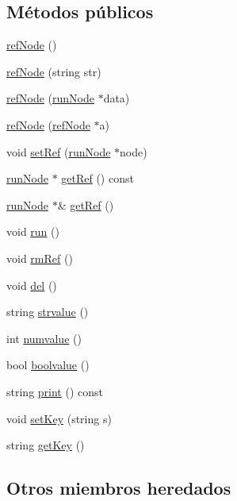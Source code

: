 \subsection*{Métodos públicos}
\begin{DoxyCompactItemize}
\item 
\hyperlink{classrefNode_a4dadca3053650b8f5ba67802460e3b94}{ref\-Node} ()
\item 
\hyperlink{classrefNode_a880ba91153659c5d38f5af5cebd27d87}{ref\-Node} (string str)
\item 
\hyperlink{classrefNode_aa2afe3e64503c9f44406b67cd40215cd}{ref\-Node} (\hyperlink{classrunNode}{run\-Node} $\ast$data)
\item 
\hyperlink{classrefNode_adea8c8e42d1a17012ee62ddeb22b5500}{ref\-Node} (\hyperlink{classrefNode}{ref\-Node} $\ast$a)
\item 
void \hyperlink{classrefNode_a6e05edbe71779a62106d8b511ae3373f}{set\-Ref} (\hyperlink{classrunNode}{run\-Node} $\ast$node)
\item 
\hyperlink{classrunNode}{run\-Node} $\ast$ \hyperlink{classrefNode_af3287bf7b98a88d97bf7076cbae2e50b}{get\-Ref} () const 
\item 
\hyperlink{classrunNode}{run\-Node} $\ast$\& \hyperlink{classrefNode_acbcb5ebaa058e5dac4fbf775b62887c7}{get\-Ref} ()
\item 
void \hyperlink{classrefNode_ad2905de207b40a8b6aec5d4ba15351d6}{run} ()
\item 
void \hyperlink{classrefNode_a57cee8085d111667cc0bb89ac8d81b2a}{rm\-Ref} ()
\item 
void \hyperlink{classrefNode_a1988e5f81b403d5154766f1d93dbb5cf}{del} ()
\item 
string \hyperlink{classrefNode_aa51d80443279f4bca750f5c36d5f9b0b}{strvalue} ()
\item 
int \hyperlink{classrefNode_ac4f857aa305a2d79d20c110b6d4c5d3d}{numvalue} ()
\item 
bool \hyperlink{classrefNode_a5dd27fd2a77b369e0646ede62b617fe7}{boolvalue} ()
\item 
string \hyperlink{classrefNode_a08700bd9a86bd5d44dac8d5679b8fd13}{print} () const 
\item 
void \hyperlink{classrefNode_ae59d59767950abe3260b55fa0276ed0a}{set\-Key} (string s)
\item 
string \hyperlink{classrefNode_ab6a0e220221d4b8ad7e896383db554a1}{get\-Key} ()
\end{DoxyCompactItemize}
\subsection*{Otros miembros heredados}


